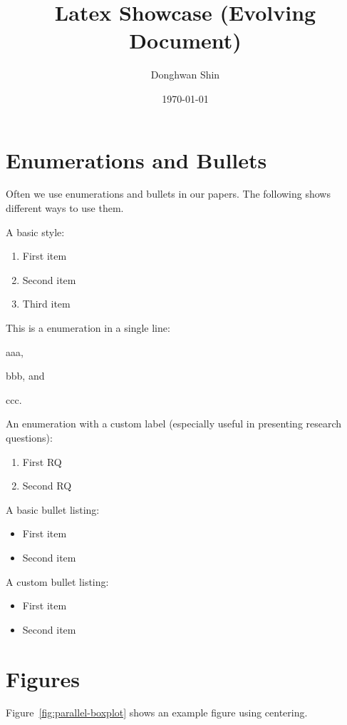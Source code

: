 \documentclass{article}
\title{Latex Showcase (Evolving Document)}
\author{Donghwan Shin}
\date{\today}
\theoremstyle{definition}
\begin{document}
\maketitle

\section{Enumerations and Bullets}
Often we use enumerations and bullets in our papers. The following shows different ways to use them.

A basic style:
\begin{enumerate}
    \item First item
    \item Second item
    \item Third item
\end{enumerate}

This is a enumeration in a single line: 
\begin{inparaenum}[(1)]
    \item aaa,
    \item bbb, and
    \item ccc.
\end{inparaenum}

An enumeration with a custom label (especially useful in presenting research questions):
\begin{enumerate}[\bf RQ1]
    \item First RQ
    \item Second RQ
\end{enumerate}

A basic bullet listing:
\begin{itemize}
    \item First item
    \item Second item
\end{itemize}

A custom bullet listing:
\begin{itemize}[-]
    \item First item
    \item Second item
\end{itemize}


\section{Figures}

Figure~\ref{fig:parallel-boxplot} shows an example figure using centering.
\end{document}
